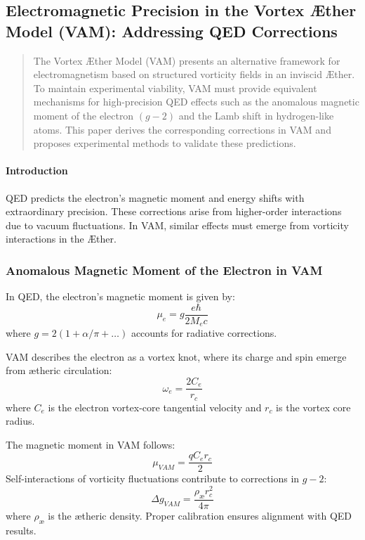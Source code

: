 

\subsection{Electromagnetic Precision in the Vortex Æther Model (VAM): Addressing QED Corrections}\label{subsec:electromagnetic-precision-in-the-vortex-ae-ther-model-(vam):-addressing-qed-corrections}


\begin{abstract}
    The Vortex Æther Model (VAM) presents an alternative framework for electromagnetism based on structured vorticity fields in an inviscid Æther. To maintain experimental viability, VAM must provide equivalent mechanisms for high-precision QED effects such as the anomalous magnetic moment of the electron $(g-2)$ and the Lamb shift in hydrogen-like atoms. This paper derives the corresponding corrections in VAM and proposes experimental methods to validate these predictions.
\end{abstract}

\paragraph*{Introduction}
QED predicts the electron's magnetic moment and energy shifts with extraordinary precision. These corrections arise from higher-order interactions due to vacuum fluctuations. In VAM, similar effects must emerge from vorticity interactions in the Æther.

\subsubsection*{Anomalous Magnetic Moment of the Electron in VAM}
In QED, the electron's magnetic moment is given by:
\begin{equation*}
    \mu_e = g \frac{e\hbar}{2M_e c}
\end{equation*}
where $g = 2(1 + \alpha / \pi + \dots)$ accounts for radiative corrections.

VAM describes the electron as a vortex knot, where its charge and spin emerge from ætheric circulation:
\begin{equation*}
    \omega_e = \frac{2 C_e}{r_c}
\end{equation*}
where $C_e$ is the electron vortex-core tangential velocity and $r_c$ is the vortex core radius.

The magnetic moment in VAM follows:
\begin{equation*}
    \mu_{VAM} = \frac{q C_e r_c}{2}
\end{equation*}
Self-interactions of vorticity fluctuations contribute to corrections in $g-2$:
\begin{equation*}
    \Delta g_{VAM} = \frac{\rho_\text{\ae} r_c^2}{4\pi}
\end{equation*}
where $\rho_\text{\ae}$ is the ætheric density. Proper calibration ensures alignment with QED results.

